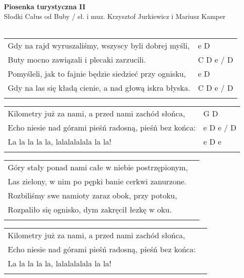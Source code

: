 \documentclass[a5paper]{article}
\begin{document}


\noindent
\fontsize{12pt}{15pt}\selectfont
\textbf{Piosenka turystyczna II} \\
\fontsize{8pt}{10pt}\selectfont
Słodki Całus od Buby / sł. i muz. Krzysztof Jurkiewicz i Mariusz Kamper \\ \\
\fontsize{10pt}{12pt}\selectfont
{}
\begin{tabular}{@{}p{9.30cm}p{3cm}@{}}
\noindent
Gdy na rajd wyruszaliśmy, wszyscy byli dobrej myśli, & e D \\
Buty mocno zawiązali i plecaki zarzucili. & C D e / D \\
Pomyśleli, jak to fajnie będzie siedzieć przy ognisku, & e D \\
Gdy na las się kładą cienie, a nad głową iskra błyska. & C D e / D  \\ \\
\end{tabular}

\noindent
\begin{tabular}{@{}p{8.30cm}p{3cm}@{}}
Kilometry już za nami, a przed nami zachód słońca, & G D \\
Echo niesie nad górami pieśń radosną, pieśń bez końca: & e D e / D \\
La la la la la, lalalalalala la la! & e D e \\ \\
\end{tabular}

\noindent
\begin{tabular}{@{}p{10.30cm}p{3cm}@{}}
Góry stały ponad nami całe w niebie postrzępionym, \\
Las zielony, w nim po pępki banie cerkwi zanurzone. \\
Rozbiliśmy swe namioty zaraz obok, przy potoku, \\
Rozpaliło się ognisko, dym zakręcił łezkę w oku. \\ \\
\end{tabular}

\noindent
\begin{tabular}{@{}p{10.30cm}p{3cm}@{}}
Kilometry już za nami, a przed nami zachód słońca, \\
Echo niesie nad górami pieśń radosną, pieśń bez końca: \\
La la la la la, lalalalalala la la! \\ \\
\end{tabular}
\end{document}
